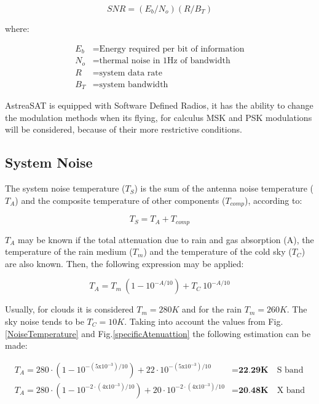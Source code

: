 \begin{equation}
SNR=(E_b/N_o)(R/B_T)
\label{SNReq}
\end{equation}

where:

\begin{align*}
	E_b&= \text{Energy required per bit of information}\\
	N_o&= \text{thermal noise in 1Hz of bandwidth}\\
	R&= \text{system data rate}\\
	B_T&= \text{system bandwidth}
\end{align*}

AstreaSAT is equipped with Software Defined Radios, it has the ability to change the modulation methods when its flying, for calculus MSK and PSK modulations will be considered, because of their more restrictive conditions.

\subsection{System Noise}
The system noise temperature ($T_S$) is the sum of the antenna noise temperature ($T_A$) and the composite temperature of other components ($T_{comp}$), according to: \cite{Jorge2012}

\begin{equation}
T_S=T_A+T_{comp}
\end{equation}

$T_A$ may be known if the total attenuation due to rain and gas absorption (A), the temperature of the rain medium ($T_m$) and the temperature of the cold sky ($T_C$) are also known. Then, the following expression may be applied:

\begin{equation}
	T_A=T_m\ (1-10^{-A/10})+T_C\ 10^{-A/10}
\end{equation}

Usually, for clouds it is considered $T_m=280K$ and for the rain $T_m=260K$. The sky noise tends to be $T_C=10K$. Taking into account the values from Fig.\ref{NoiseTemperature} and Fig.\ref{specificAtenuattion} the following estimation can be made:

\begin{align*}
	T_A=280\cdot (1-10^{-(5\mathrm{x}10^{-3})/10})+22\cdot 10^{-(5\mathrm{x}10^{-3})/10}&=\textbf{22.29K} \quad \text{S band} \\
	T_A=280\cdot (1-10^{-2\cdot(4\mathrm{x}10^{-3})/10})+20\cdot 10^{-2\cdot(4\mathrm{x}10^{-3})/10}&=\textbf{20.48K} \quad \text{X band} 
\end{align*}

